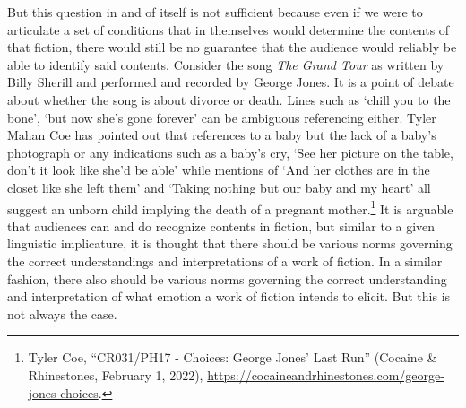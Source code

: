 \documentclass[phdthesis,12pt,final]{wuthesis}
\theoremstyle{definition}
\theoremstyle{definition}
\theoremstyle{definition}
\theoremstyle{definition}
\theoremstyle{remark}
\begin{document}
But this question in and of itself is not sufficient because even if we were to articulate a set of conditions that in themselves would determine the contents of that fiction, there would still be no guarantee that the audience would reliably be able to identify said contents. Consider the song \emph{The Grand Tour} as written by Billy Sherill and performed and recorded by George Jones. It is a point of debate about whether the song is about divorce or death. Lines such as `chill you to the bone', `but now she's gone forever' can be ambiguous referencing either. Tyler Mahan Coe has pointed out that references to a baby but the lack of a baby's photograph or any indications such as a baby's cry, `See her picture on the table, don't it look like she'd be able' while mentions of `And her clothes are in the closet like she left them' and `Taking nothing but our baby and my heart' all suggest an unborn child implying the death of a pregnant mother.\footnote{Tyler Coe, {``{CR031}/{PH17} - {Choices}: {George Jones}' {Last Run}''} (Cocaine \& Rhinestones, February 1, 2022), \url{https://cocaineandrhinestones.com/george-jones-choices}.} It is arguable that audiences can and do recognize contents in fiction, but similar to a given linguistic implicature, it is thought that there should be various norms governing the correct understandings and interpretations of a work of fiction. In a similar fashion, there also should be various norms governing the correct understanding and interpretation of what emotion a work of fiction intends to elicit. But this is not always the case.
\end{document}
